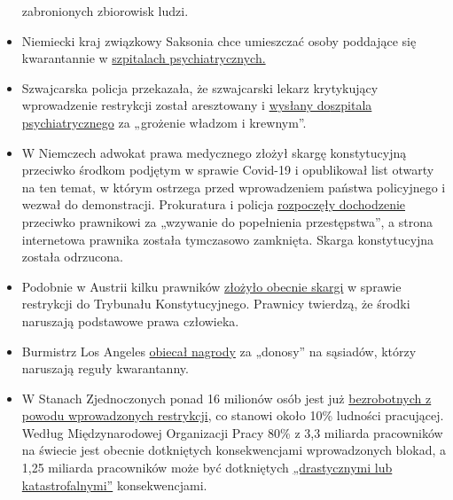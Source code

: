 \begin{itemize}
  zabronionych zbiorowisk ludzi.
\item
  Niemiecki kraj związkowy Saksonia chce umieszczać osoby poddające się
  kwarantannie w
  \href{https://www.welt.de/politik/deutschland/article207198029/Coronavirus-Sachsen-will-Quarantaene-Verweigerer-in-Psychiatrien-sperren.html}{szpitalach
  psychiatrycznych.}
\item
  Szwajcarska policja przekazała, że szwajcarski lekarz krytykujący
  wprowadzenie restrykcji został aresztowany i
  \href{https://www.srf.ch/news/regional/aargau-solothurn/festnahme-von-corona-kritiker-verschwoerung-oder-normale-intervention-der-aargauer-behoerden}{wysłany
  do}\href{https://www.srf.ch/news/regional/aargau-solothurn/festnahme-von-corona-kritiker-verschwoerung-oder-normale-intervention-der-aargauer-behoerden}{szpitala
  psychiatrycznego} za „grożenie władzom i krewnym''.
\item
  W Niemczech adwokat prawa medycznego złożył skargę konstytucyjną
  przeciwko środkom podjętym w sprawie Covid-19 i opublikował list
  otwarty na ten temat, w którym ostrzega przed wprowadzeniem państwa
  policyjnego i wezwał do demonstracji. Prokuratura i policja
  \href{https://www.morgenweb.de/mannheimer-morgen_artikel,-coronavirus-aufruf-zu-straftaten-ermittlungen-gegen-heidelberger-rechtsanwaeltin-_arid,1627078.html}{rozpoczęły
  dochodzenie} przeciwko prawnikowi za „wzywanie do popełnienia
  przestępstwa'', a strona internetowa prawnika została tymczasowo
  zamknięta. Skarga konstytucyjna została odrzucona.
\item
  Podobnie w Austrii kilku prawników
  \href{https://wien.orf.at/stories/3043172/}{złożyło obecnie skargi} w
  sprawie restrykcji do Trybunału Konstytucyjnego. Prawnicy twierdzą, że
  środki naruszają podstawowe prawa człowieka.
\item
  Burmistrz Los Angeles
  \href{https://townhall.com/tipsheet/bethbaumann/2020/04/04/la-mayor-garcetti-says-snitches-get-rewards-for-ratting-out-their-neighbors-n2566348}{obiecał
  nagrod}\href{https://townhall.com/tipsheet/bethbaumann/2020/04/04/la-mayor-garcetti-says-snitches-get-rewards-for-ratting-out-their-neighbors-n2566348}{y}
  za „donosy'' na sąsiadów, którzy naruszają reguły kwarantanny.
\item
  W Stanach Zjednoczonych ponad 16 milionów osób jest już
  \href{https://www.nytimes.com/2020/04/09/us/coronavirus-us-news.html}{bezrobotnych
  z powodu wprowadzonych restrykcji}, co stanowi około 10\% ludności
  pracującej. Według Międzynarodowej Organizacji Pracy 80\% z 3,3
  miliarda pracowników na świecie jest obecnie dotkniętych
  konsekwencjami wprowadzonych blokad, a 1,25 miliarda pracowników może
  być dotkniętych
  \href{https://www.ilo.org/global/about-the-ilo/newsroom/news/WCMS_740893/lang--en/index.htm}{„drastycznymi
  lub katastrofalnymi''} konsekwencjami.
\end{itemize}

